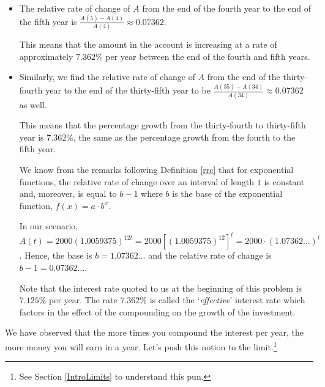 \documentclass{ximera}
\begin{document}
\begin{example}
\begin{explanation}
\begin{enumerate}
\begin{itemize}

\item  The relative rate of change of $A$ from the end of the fourth year to the end of the fifth year is $\frac{A(5)-A(4)}{A(4)} \approx 0.07362$. 


This means that the amount in the account is increasing at a rate of approximately $7.362 \%$ per year between the end of the fourth and fifth years.

\item Similarly, we find the relative rate of change of $A$ from the end  of the thirty-fourth year to the end of the thirty-fifth year to be $\frac{A(35)-A(34)}{A(34)} \approx  0.07362$ as well.  

This means that the percentage growth from the thirty-fourth to thirty-fifth year is $7.362 \%$, the same as the percentage growth from the fourth to the fifth year.

We know from the remarks following Definition \ref{rrc} that for exponential functions, the relative rate of change over an interval of length $1$ is constant and, moreover, is equal to $b-1$ where $b$ is the base of the exponential function, $f(x) = a \cdot b^{x}$.  

 

In our scenario,  $A(t) = 2000 (1.0059375)^{12t} = 2000  \left[(1.0059375)^{12}\right]^{t} = 2000 \cdot (1.07362 \ldots)^t$.  Hence, the base is $b = 1.07362 \ldots$ and the relative rate of change is $b-1 = 0.07362 \ldots$.    

 

Note that the interest rate quoted to us at the beginning of this problem is $7.125 \%$ per year.  The rate $7.362 \%$ is called the `\textit{effective}' interest rate which factors in the effect of the compounding on the growth of the investment.

\end{itemize}

\end{enumerate}
\end{explanation}
\end{example}





We have observed that the more times you compound the interest per year, the more money you will earn in a year.  Let's push this notion to the limit.\footnote{See Section \ref{IntroLimits} to understand this pun.}  
\end{document}
